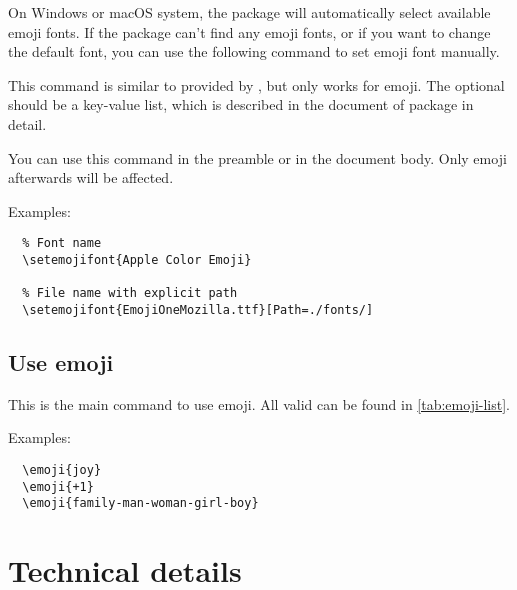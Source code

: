 \documentclass{l3doc}
\begin{document}
On Windows or macOS system, the  package will automatically select available emoji
fonts. If the package can't find any emoji fonts, or if you want to change the default font,
you can use the following command to set emoji font manually.

\begin{function}{\setemojifont}
  \begin{syntax}
  \end{syntax}
  This command is similar to  provided by , but only works for
  emoji. The optional  should be a key-value list, which is described in the
  document of  package in detail.

  You can use this command in the preamble or in the document body. Only emoji afterwards will
  be affected.
\end{function}

Examples:

\begin{verbatim}
  % Font name
  \setemojifont{Apple Color Emoji}

  % File name with explicit path
  \setemojifont{EmojiOneMozilla.ttf}[Path=./fonts/]
\end{verbatim}

\subsection{ Use emoji}

\begin{function}{\emoji}
  \begin{syntax}
  \end{syntax}
  This is the main command to use emoji. All valid  can be found in
  \autoref{tab:emoji-list}.
\end{function}

Examples:

\begin{verbatim}
  \emoji{joy}
  \emoji{+1}
  \emoji{family-man-woman-girl-boy}
\end{verbatim}

  

\section{ Technical details}
\end{document}
